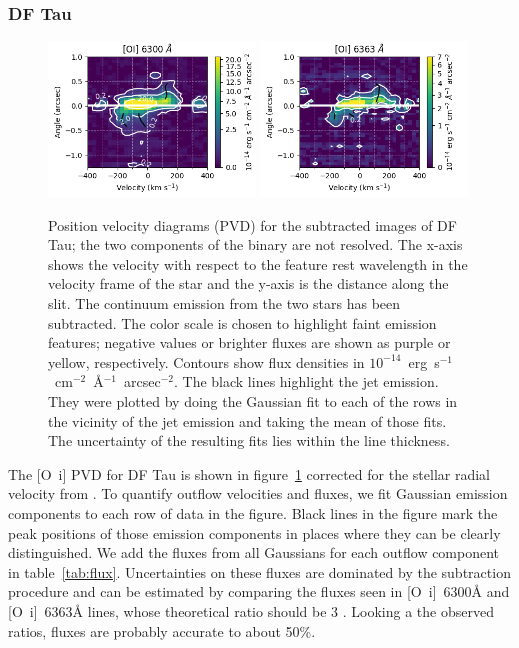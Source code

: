 \documentclass[twocolumn]{aastex62}
\begin{document}
\subsubsection{DF Tau}
\begin{figure}
\begin{center}
\includegraphics[width=0.49\textwidth]{DF_6300.png}
\includegraphics[width=0.49\textwidth]{DF_6363.png}
\caption{Position velocity diagrams (PVD) for the subtracted images
of DF Tau; the two components of the binary are not resolved. The x-axis
shows the velocity with respect to the feature rest wavelength in the
velocity frame of the star and the y-axis is the distance along the slit. The
continuum emission from the two stars has been subtracted. The color scale is chosen to highlight faint emission features; negative values or brighter fluxes are shown as purple or yellow, respectively. Contours show flux densities in $10^{-14}$~erg~s$^{-1}$~cm$^{-2}$~\AA{}$^{-1}$~arcsec$^{-2}$.
The black lines highlight the jet emission. They were plotted by doing the Gaussian fit to each of the rows in the vicinity of the jet emission and taking the mean of those fits. The uncertainty of the resulting fits lies within the line thickness.
\label{fig:DFTau}}
\end{center}
\end{figure}
The [O~{\sc i}] PVD for DF Tau is shown in figure~\ref{fig:DFTau}
corrected for the stellar radial velocity from \citet{2006AstL...32..759G}.
To quantify outflow velocities and fluxes, we fit Gaussian emission components
to each row of data in the figure. Black lines in the figure mark the peak
positions of those emission components in places where they can be clearly
distinguished. We add the fluxes from all Gaussians for each outflow component
in table~\ref{tab:flux}. Uncertainties on these fluxes are dominated by the
subtraction procedure and can be estimated by comparing the fluxes seen in
[O~{\sc i}]~6300\AA{} and [O~{\sc i}]~6363\AA{} lines, whose theoretical ratio
should be 3 \citep{2000MNRAS.312..813S}. Looking a the observed ratios, fluxes
are probably accurate to about 50\%.
\end{document}
